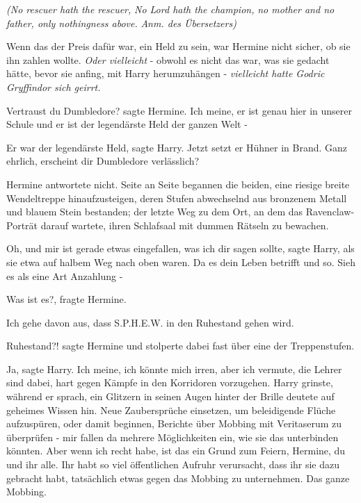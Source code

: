 \emph{(No rescuer hath the rescuer,}
\emph{No Lord hath the champion,}
\emph{no mother and no father, only nothingness above.}
\emph{Anm. des Übersetzers)}

Wenn das der Preis dafür war, ein Held zu sein, war Hermine nicht sicher, ob sie
ihn zahlen wollte. \emph{Oder vielleicht} - obwohl es nicht das war, was sie
gedacht hätte, bevor sie anfing, mit Harry herumzuhängen - \emph{vielleicht
hatte Godric Gryffindor sich geirrt.}

\glqq{}Vertraust du Dumbledore?\grqq{} sagte Hermine. \glqq{}Ich meine, er ist
genau hier in unserer Schule und er ist der legendärste Held der ganzen Welt
-\grqq{}

\glqq{}Er war der legendärste Held\grqq{}, sagte Harry. \glqq{}Jetzt setzt er
Hühner in Brand. Ganz ehrlich, erscheint dir Dumbledore verlässlich?\grqq{}

Hermine antwortete nicht. Seite an Seite begannen die beiden, eine riesige
breite Wendeltreppe hinaufzusteigen, deren Stufen abwechselnd aus bronzenem
Metall und blauem Stein bestanden; der letzte Weg zu dem Ort, an dem das
Ravenclaw-Porträt darauf wartete, ihren Schlafsaal mit dummen Rätseln zu
bewachen.

\glqq{}Oh, und mir ist gerade etwas eingefallen, was ich dir sagen sollte\grqq{},
sagte Harry, als sie etwa auf halbem Weg nach oben waren. \glqq{}Da es dein Leben
betrifft und so. Sieh es als eine Art Anzahlung -\grqq{}

\glqq{}Was ist es?\grqq{}, fragte Hermine.

\glqq{}Ich gehe davon aus, dass S.P.H.E.W. in den Ruhestand gehen wird.\grqq{}

\glqq{}Ruhestand?!\grqq{} sagte Hermine und stolperte dabei fast über eine der
Treppenstufen.

\glqq{}Ja\grqq{}, sagte Harry. \glqq{}Ich meine, ich könnte mich irren, aber ich
vermute, die Lehrer sind dabei, hart gegen Kämpfe in den Korridoren
vorzugehen.\grqq{} Harry grinste, während er sprach, ein Glitzern in seinen
Augen hinter der Brille deutete auf geheimes Wissen hin. \glqq{}Neue
Zaubersprüche einsetzen, um beleidigende Flüche aufzuspüren, oder damit
beginnen, Berichte über Mobbing mit Veritaserum zu überprüfen - mir fallen da
mehrere Möglichkeiten ein, wie sie das unterbinden könnten. Aber wenn ich recht
habe, ist das ein Grund zum Feiern, Hermine, du und ihr alle. Ihr habt so viel
öffentlichen Aufruhr verursacht, dass ihr sie dazu gebracht habt, tatsächlich
etwas gegen das Mobbing zu unternehmen. Das ganze Mobbing.\grqq{}

